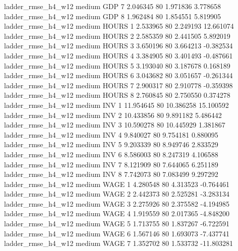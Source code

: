  ladder_rmse_h4_w12     medium      GDP                 7  2.046345 80       1.971836           3.778658
 ladder_rmse_h4_w12     medium      GDP                 8  1.962484 80       1.854551           5.819905
 ladder_rmse_h4_w12     medium    HOURS                 1  2.533965 80       2.249193          12.661074
 ladder_rmse_h4_w12     medium    HOURS                 2  2.585359 80       2.441505           5.892019
 ladder_rmse_h4_w12     medium    HOURS                 3  3.650196 80       3.664213          -0.382534
 ladder_rmse_h4_w12     medium    HOURS                 4  3.384905 80       3.401493          -0.487661
 ladder_rmse_h4_w12     medium    HOURS                 5  3.193040 80       3.187678           0.168189
 ladder_rmse_h4_w12     medium    HOURS                 6  3.043682 80       3.051657          -0.261344
 ladder_rmse_h4_w12     medium    HOURS                 7  2.900317 80       2.910778          -0.359398
 ladder_rmse_h4_w12     medium    HOURS                 8  2.760845 80       2.750550           0.374278
 ladder_rmse_h4_w12     medium      INV                 1 11.954645 80      10.386258          15.100592
 ladder_rmse_h4_w12     medium      INV                 2 10.433856 80       9.891182           5.486442
 ladder_rmse_h4_w12     medium      INV                 3 10.590278 80      10.445929           1.381867
 ladder_rmse_h4_w12     medium      INV                 4  9.840027 80       9.754181           0.880095
 ladder_rmse_h4_w12     medium      INV                 5  9.203339 80       8.949746           2.833529
 ladder_rmse_h4_w12     medium      INV                 6  8.586003 80       8.247319           4.106588
 ladder_rmse_h4_w12     medium      INV                 7  8.121909 80       7.644065           6.251189
 ladder_rmse_h4_w12     medium      INV                 8  7.742073 80       7.083499           9.297292
 ladder_rmse_h4_w12     medium     WAGE                 1  4.280548 80       4.313523          -0.764461
 ladder_rmse_h4_w12     medium     WAGE                 2  2.442373 80       2.525281          -3.283134
 ladder_rmse_h4_w12     medium     WAGE                 3  2.275926 80       2.375582          -4.194985
 ladder_rmse_h4_w12     medium     WAGE                 4  1.919559 80       2.017365          -4.848200
 ladder_rmse_h4_w12     medium     WAGE                 5  1.713755 80       1.837267          -6.722591
 ladder_rmse_h4_w12     medium     WAGE                 6  1.567146 80       1.693073          -7.437741
 ladder_rmse_h4_w12     medium     WAGE                 7  1.352702 80       1.533732         -11.803281
